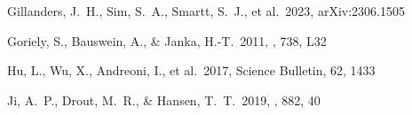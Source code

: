 \documentclass[twocolumn,twocolappendix]{aastex63}
\begin{document}
\begin{thebibliography}{}
 Gillanders, J.~H., Sim, S.~A., Smartt, S.~J., et al.\ 2023, arXiv:2306.1505




 Goriely, S., Bauswein, A., \& Janka, H.-T.\ 2011, \apjl, 738, L32
















 Hu, L., Wu, X., Andreoni, I., et al.\ 2017, Science Bulletin, 62, 1433






 Ji, A.~P., Drout, M.~R., \& Hansen, T.~T.\ 2019, \apj, 882, 40





\end{thebibliography}
\end{document}

